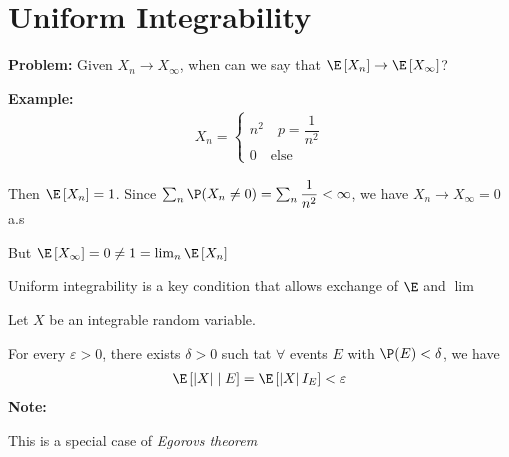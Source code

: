 \section{Uniform Integrability}
\noindent\textbf{Problem:} Given $X_n\to X_\infty$, when can we say that $\E\left[X_n\right]\to\E\left[X_\infty\right]$?
\par\bigskip
\noindent\textbf{Example:}
\begin{equation*}
  \begin{gathered}
    X_n  = \begin{cases}
      n^2\quad p=\dfrac{1}{n^2}\\ 0\quad\text{else}
    \end{cases}
  \end{gathered}
\end{equation*}\par
\noindent Then $\E\left[X_n\right] = 1$. Since $\sum_n \P(X_n\neq0) = \sum_n\dfrac{1}{n^2}<\infty$, we have $X_n\to X_\infty = 0$ a.s\par
\noindent But $\E\left[X_\infty\right] = 0\neq1 =\lim_{n}\E\left[X_n\right]$
\par\bigskip
\noindent Uniform integrability is a key condition that allows exchange of $\E$ and $\lim$
\par\bigskip
\begin{lem}[]{}
  Let $X$ be an integrable random variable.\par
  \noindent For every $\varepsilon>0$, there exists $\delta>0$ such tat $\forall$ events $E$ with $\P(E)<\delta$, we have
  \begin{equation*}
    \begin{gathered}
      \E\left[\left|X\right|\mid E\right] = \E\left[\left|X\right|I_E\right]<\varepsilon
    \end{gathered}
  \end{equation*}
  \noindent\textbf{Note:}\par
  \noindent This is a special case of \textit{Egorovs theorem}
\end{lem}
\par\bigskip
